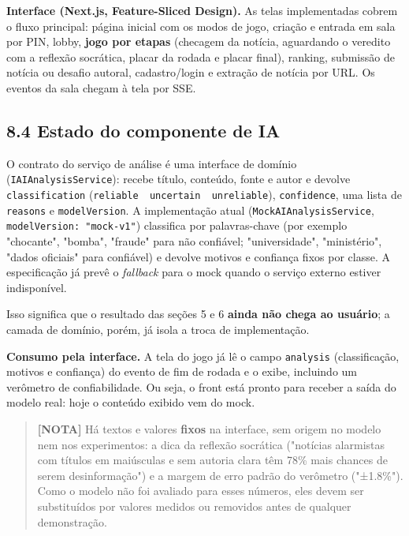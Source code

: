 \documentclass[
  brazilian,
  11pt,
]{article}
\begin{document}
\textbf{Interface (Next.js, Feature-Sliced Design).} As telas implementadas cobrem o fluxo principal: página inicial com os modos de jogo, criação e entrada em sala por PIN, lobby, \textbf{jogo por etapas} (checagem da notícia, aguardando o veredito com a reflexão socrática, placar da rodada e placar final), ranking, submissão de notícia ou desafio autoral, cadastro/login e extração de notícia por URL. Os eventos da sala chegam à tela por SSE.

\subsection{8.4 Estado do componente de IA}\label{estado-do-componente-de-ia}

O contrato do serviço de análise é uma interface de domínio (\texttt{IAIAnalysisService}): recebe título, conteúdo, fonte e autor e devolve \texttt{classification} (\texttt{reliable\ \textbar{}\ uncertain\ \textbar{}\ unreliable}), \texttt{confidence}, uma lista de \texttt{reasons} e \texttt{modelVersion}. A implementação atual (\texttt{MockAIAnalysisService}, \texttt{modelVersion:\ "mock-v1"}) classifica por palavras-chave (por exemplo "chocante", "bomba", "fraude" para não confiável; "universidade", "ministério", "dados oficiais" para confiável) e devolve motivos e confiança fixos por classe. A especificação já prevê o \emph{fallback} para o mock quando o serviço externo estiver indisponível.

Isso significa que o resultado das seções 5 e 6 \textbf{ainda não chega ao usuário}; a camada de domínio, porém, já isola a troca de implementação.

\textbf{Consumo pela interface.} A tela do jogo já lê o campo \texttt{analysis} (classificação, motivos e confiança) do evento de fim de rodada e o exibe, incluindo um verômetro de confiabilidade. Ou seja, o front está pronto para receber a saída do modelo real: hoje o conteúdo exibido vem do mock.

\begin{quote}
\textbf{{[}NOTA{]}} Há textos e valores \textbf{fixos} na interface, sem origem no modelo nem nos experimentos: a dica da reflexão socrática ("notícias alarmistas com títulos em maiúsculas e sem autoria clara têm 78\% mais chances de serem desinformação") e a margem de erro padrão do verômetro ("±1.8\%"). Como o modelo não foi avaliado para esses números, eles devem ser substituídos por valores medidos ou removidos antes de qualquer demonstração.
\end{quote}
\end{document}
